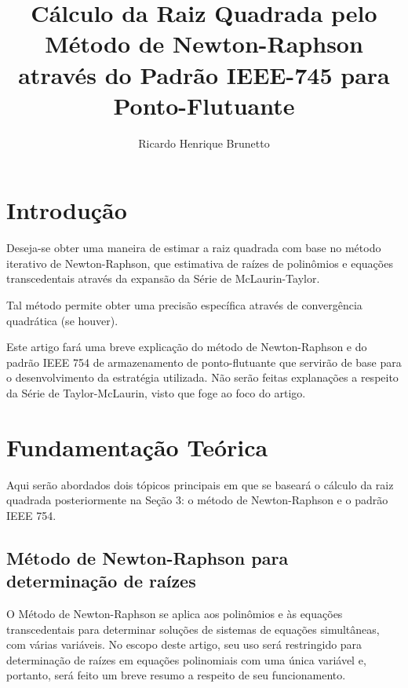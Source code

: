 

\sloppy

\title{Cálculo da Raiz Quadrada pelo Método de Newton-Raphson\\através do Padrão IEEE-745 para Ponto-Flutuante}

\author{Ricardo Henrique Brunetto}


\address{Departamento de Informática -- Universidade Estadual de Maringá (UEM)\\
	Maringá -- PR -- Brasil
}



	\maketitle

  \section{Introdução}
	Deseja-se obter uma maneira de estimar a raiz quadrada com base no método iterativo de Newton-Raphson, que
	estimativa de raízes de polinômios e equações transcedentais através da expansão da Série de McLaurin-Taylor.

	Tal método permite obter uma precisão específica através de convergência quadrática (se houver).

	Este artigo fará uma breve explicação do método de Newton-Raphson e do padrão IEEE 754 de armazenamento de ponto-flutuante
	que servirão de base para o desenvolvimento da estratégia utilizada. Não serão feitas explanações a respeito da Série de Taylor-McLaurin,
	visto que foge ao foco do artigo.

	\section{Fundamentação Teórica}
	\label{sec:fund_teor}
	Aqui serão abordados dois tópicos principais em que se baseará o cálculo da raiz quadrada posteriormente na Seção 3:
	o método de Newton-Raphson e o padrão IEEE 754.

	\subsection{Método de Newton-Raphson para determinação de raízes}
	O Método de Newton-Raphson se aplica aos polinômios e às equações transcedentais
	para determinar soluções de sistemas de equações simultâneas, com várias variáveis.
	No escopo deste artigo, seu uso será restringido para determinação de raízes em
	equações polinomiais com uma única variável e, portanto, será feito um breve resumo
	a respeito de seu funcionamento.

